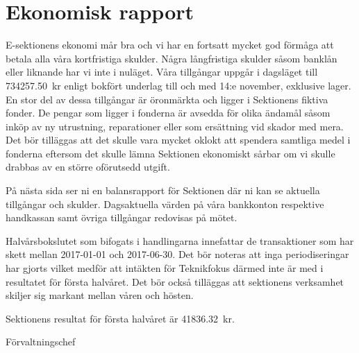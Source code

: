 \documentclass[../_main/handlingar.tex]{subfiles}
\begin{document}
\section{Ekonomisk rapport}
E-sektionens ekonomi mår bra och vi har en fortsatt mycket god förmåga att betala alla våra kortfristiga skulder. Några långfristiga skulder såsom banklån eller liknande har vi inte i nuläget. Våra tillgångar uppgår i dagsläget till \SI{734257.50}{kr} enligt bokfört underlag till och med 14:e november, exklusive lager. En stor del av dessa tillgångar är öronmärkta och ligger i Sektionens fiktiva fonder. De pengar som ligger i fonderna är avsedda för olika ändamål såsom inköp av ny utrustning, reparationer eller som ersättning vid skador med mera. Det bör tilläggas att det skulle vara mycket oklokt att spendera samtliga medel i fonderna eftersom det skulle lämna Sektionen ekonomiskt sårbar om vi skulle drabbas av en större oförutsedd utgift.

På nästa sida ser ni en balansrapport för Sektionen där ni kan se aktuella tillgångar och skulder. Dagsaktuella värden på våra bankkonton respektive handkassan samt övriga tillgångar redovisas på mötet.

Halvårsbokslutet som bifogats i handlingarna innefattar de transaktioner som har skett mellan 2017-01-01 och 2017-06-30. Det bör noteras att inga periodiseringar har gjorts vilket medför att intäkten för Teknikfokus därmed inte är med i resultatet för första halvåret. Det bör också tilläggas att sektionens verksamhet skiljer sig markant mellan våren och hösten.

Sektionens resultat för första halvåret är \SI{41836.32}{kr}.
\begin{signatures}{1}
    \mvh
    \signature{Sophia Grimmeiss Grahm}{Förvaltningschef}
\end{signatures}
\end{document}

